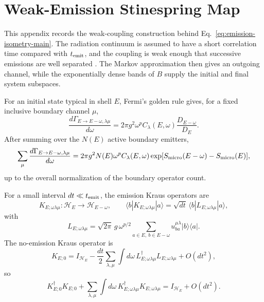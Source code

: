 \documentclass[12pt]{article}
\newcommand{\Smicro}{S_{\rm micro}}
\newcommand{\ket}[1]{|#1\rangle}
\newcommand{\bra}[1]{\langle #1|}
\begin{document}
\appendix

\section{Weak-Emission Stinespring Map}
\label{app:weak-emission-map}

This appendix records the weak-coupling construction behind
Eq.~\eqref{eq:emission-isometry-main}.  The radiation continuum is assumed to
have a short correlation time compared with $t_{\rm emit}$, and the coupling is
weak enough that successive emissions are well separated
\cite{CohenTannoudji1992,BreuerPetruccione2002}.  The Markov approximation then
gives an outgoing channel, while the exponentially dense bands of $B$ supply
the initial and final system subspaces.

For an initial state typical in shell $E$, Fermi's golden rule gives, for a
fixed inclusive boundary channel $\mu$,
\begin{equation}
    \frac{d\Gamma_{E\to E-\omega,\lambda\mu}}{d\omega}
    =
    2\pi g^2 \omega^p
    C_\lambda(E,\omega)
    \frac{D_{E-\omega}}{D_E}.
\end{equation}
After summing over the $N(E)$ active boundary emitters,
\begin{equation}
    \sum_\mu\frac{d\Gamma_{E\to E-\omega,\lambda\mu}}{d\omega}
    =
    2\pi g^2 N(E)\omega^p C_\lambda(E,\omega)
    \exp[\Smicro(E-\omega)-\Smicro(E)],
\end{equation}
up to the overall normalization of the boundary operator count.

For a small interval $dt\ll t_{\rm emit}$, the emission Kraus operators are
\begin{equation}
    K_{E;\omega\lambda\mu}:\mathcal H_E
    \longrightarrow \mathcal H_{E-\omega},
    \qquad
    \bra bK_{E;\omega\lambda\mu}\ket a
    =
    \sqrt{dt}\,\bra bL_{E;\omega\lambda\mu}\ket a,
\end{equation}
with
\begin{equation}
    L_{E;\omega\lambda\mu}
    =
    \sqrt{2\pi}\,g\,\omega^{p/2}
    \sum_{a\in E,\ b\in E-\omega}
    u^{\mu\lambda}_{ba}\ket b\bra a .
\end{equation}
The no-emission Kraus operator is
\begin{equation}
    K_{E;0}
    =
    I_{\mathcal H_E}
    -
    \frac{dt}{2}
    \sum_{\lambda,\mu}\int d\omega\,
    L_{E;\omega\lambda\mu}^\dagger L_{E;\omega\lambda\mu}
    +O(dt^2),
\end{equation}
so
\begin{equation}
    K_{E;0}^\dagger K_{E;0}
    +
    \sum_{\lambda,\mu}\int d\omega\,
    K_{E;\omega\lambda\mu}^\dagger K_{E;\omega\lambda\mu}
    =
    I_{\mathcal H_E}+O(dt^2).
\end{equation}
\end{document}
